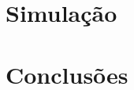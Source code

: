 \section{Simulação}
\begin{comment}
- Explicação dos elementos da visualização
>
>
>
>
>
- Screenshots
>
>
>
>
>
- Visualização
>
>
>
>
>
\end{commet}

\section{Testes}
\begin{comment}
    - Explicar as tabelas
>
>
>
>
>
    - Explicar o uso das tabelas como prova, visto que não podemos comparar com outras implementações
>
>
>
>
>
\end{comment}

\section{Conclusões}
